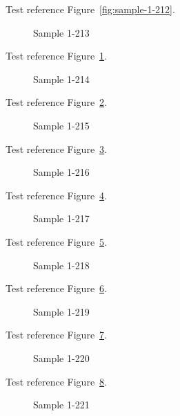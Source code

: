 Test reference Figure~\ref{fig:sample-1-212}.

\begin{figure}[tbhp]
\caption{Sample 1-213}
\label{fig:sample-1-213}
\end{figure}

Test reference Figure~\ref{fig:sample-1-213}.

\begin{figure}[tbhp]
\caption{Sample 1-214}
\label{fig:sample-1-214}
\end{figure}

Test reference Figure~\ref{fig:sample-1-214}.

\begin{figure}[tbhp]
\caption{Sample 1-215}
\label{fig:sample-1-215}
\end{figure}

Test reference Figure~\ref{fig:sample-1-215}.

\begin{figure}[tbhp]
\caption{Sample 1-216}
\label{fig:sample-1-216}
\end{figure}

Test reference Figure~\ref{fig:sample-1-216}.

\begin{figure}[tbhp]
\caption{Sample 1-217}
\label{fig:sample-1-217}
\end{figure}

Test reference Figure~\ref{fig:sample-1-217}.

\begin{figure}[tbhp]
\caption{Sample 1-218}
\label{fig:sample-1-218}
\end{figure}

Test reference Figure~\ref{fig:sample-1-218}.

\begin{figure}[tbhp]
\caption{Sample 1-219}
\label{fig:sample-1-219}
\end{figure}

Test reference Figure~\ref{fig:sample-1-219}.

\begin{figure}[tbhp]
\caption{Sample 1-220}
\label{fig:sample-1-220}
\end{figure}

Test reference Figure~\ref{fig:sample-1-220}.

\begin{figure}[tbhp]
\caption{Sample 1-221}
\label{fig:sample-1-221}
\end{figure}


